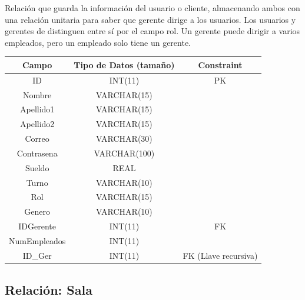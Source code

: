 \documentclass[12pt, fleqn]{report}                             %
\begin{document}
            Relación que guarda la información del usuario o cliente, almacenando ambos
            con una relación unitaria para saber que gerente dirige a los usuarios.
            Los usuarios y gerentes de distinguen entre sí por el campo rol.
            Un gerente puede dirigir a varios empleados, pero un empleado solo tiene un gerente.

            \vspace{2em}

            \small{
            \begin{tabular}{| c | c | c |}
                \hline
                \textbf{Campo} & \textbf{Tipo de Datos (tamaño)} & \textbf{Constraint} \\[0.5ex] 
                \hline\hline
                
                ID          & INT(11)       & PK                    \\
                Nombre      & VARCHAR(15)   &                       \\
                Apellido1   & VARCHAR(15)   &                       \\
                Apellido2   & VARCHAR(15)   &                       \\
                Correo      & VARCHAR(30)   &                       \\
                Contrasena  & VARCHAR(100)  &                       \\
                Sueldo      & REAL          &                       \\
                Turno       & VARCHAR(10)   &                       \\
                Rol         & VARCHAR(15)   &                       \\
                Genero      & VARCHAR(10)   &                       \\
                IDGerente   & INT(11)       & FK                    \\
                NumEmpleados& INT(11)       &                       \\
                ID\_Ger     & INT(11)       & FK (Llave recursiva)  \\
                \hline
            \end{tabular}
            }

        \subsection*{Relación: Sala}
\end{document}
